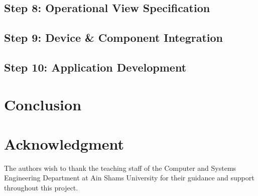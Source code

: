 \documentclass[conference]{IEEEtran}
\begin{document}
\subsection{Step 8: Operational View Specification}

\subsection{Step 9: Device \& Component Integration}

\subsection{Step 10: Application Development}


\section{Conclusion}


\section*{Acknowledgment}
The authors wish to thank the teaching staff of the Computer and Systems Engineering Department at Ain Shams University for their guidance and support throughout this project.




\end{document}
